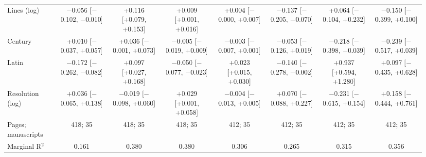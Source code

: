 \begin{table}[htbp]
\begin{tabular}{lccccccc}
    Lines (log) & $-$0.056 [$-$0.102, $-$0.010] & +0.116 [+0.079, +0.153] & +0.009 [+0.001, +0.016] & +0.004 [$-$0.000, +0.007] & $-$0.137 [$-$0.205, $-$0.070] & +0.064 [$-$0.104, +0.232] & $-$0.150 [$-$0.399, +0.100] \\
    Century & +0.010 [$-$0.037, +0.057] & +0.036 [$-$0.001, +0.073] & $-$0.005 [$-$0.019, +0.009] & $-$0.003 [$-$0.007, +0.001] & $-$0.053 [$-$0.126, +0.019] & $-$0.218 [$-$0.398, $-$0.039] & $-$0.239 [$-$0.517, +0.039] \\
    Latin & $-$0.172 [$-$0.262, $-$0.082] & +0.097 [+0.027, +0.168] & $-$0.050 [$-$0.077, $-$0.023] & +0.023 [+0.015, +0.030] & $-$0.140 [$-$0.278, $-$0.002] & +0.937 [+0.594, +1.280] & +0.097 [$-$0.435, +0.628] \\
    Resolution (log) & +0.036 [$-$0.065, +0.138] & $-$0.019 [$-$0.098, +0.060] & +0.029 [+0.001, +0.058] & $-$0.004 [$-$0.013, +0.005] & +0.070 [$-$0.088, +0.227] & $-$0.231 [$-$0.615, +0.154] & +0.158 [$-$0.444, +0.761] \\
    Pages; manuscripts & 418; 35 & 418; 35 & 418; 35 & 412; 35 & 412; 35 & 412; 35 & 412; 35 \\
    Marginal R$^2$ & 0.161 & 0.380 & 0.380 & 0.306 & 0.265 & 0.315 & 0.356 \\
    \bottomrule
  \end{tabular}
\end{table}
